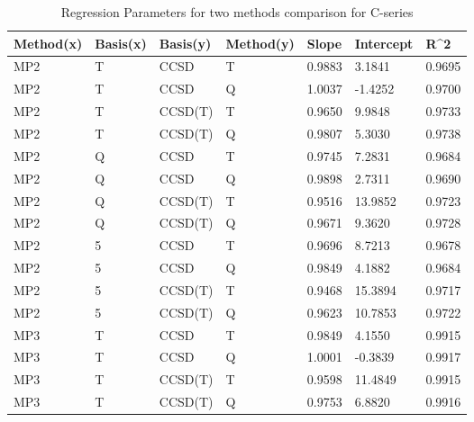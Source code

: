 \begin{table}
  \caption{Regression Parameters for two methods comparison for C-series}
  \label{tbl:regression-two-c}
  \begin{tabular}{l l l l l l l }
    \hline
    Method(x) & Basis(x) & Basis(y) & Method(y) & Slope & Intercept & R^2 \\ 
    \hline
    MP2 & T & CCSD & T & 0.9883 & 3.1841 & 0.9695 \\ 
    MP2 & T & CCSD & Q & 1.0037 & -1.4252 & 0.9700 \\ 
    MP2 & T & CCSD(T) & T & 0.9650 & 9.9848 & 0.9733 \\ 
    MP2 & T & CCSD(T) & Q & 0.9807 & 5.3030 & 0.9738 \\ 
    MP2 & Q & CCSD & T & 0.9745 & 7.2831 & 0.9684 \\ 
    MP2 & Q & CCSD & Q & 0.9898 & 2.7311 & 0.9690 \\ 
    MP2 & Q & CCSD(T) & T & 0.9516 & 13.9852 & 0.9723 \\ 
    MP2 & Q & CCSD(T) & Q & 0.9671 & 9.3620 & 0.9728 \\ 
    MP2 & 5 & CCSD & T & 0.9696 & 8.7213 & 0.9678 \\ 
    MP2 & 5 & CCSD & Q & 0.9849 & 4.1882 & 0.9684 \\ 
    MP2 & 5 & CCSD(T) & T & 0.9468 & 15.3894 & 0.9717 \\ 
    MP2 & 5 & CCSD(T) & Q & 0.9623 & 10.7853 & 0.9722 \\ 
    MP3 & T & CCSD & T & 0.9849 & 4.1550 & 0.9915 \\ 
    MP3 & T & CCSD & Q & 1.0001 & -0.3839 & 0.9917 \\ 
    MP3 & T & CCSD(T) & T & 0.9598 & 11.4849 & 0.9915 \\ 
    MP3 & T & CCSD(T) & Q & 0.9753 & 6.8820 & 0.9916 \\ 
    \hline
  \end{tabular}
\end{table}
